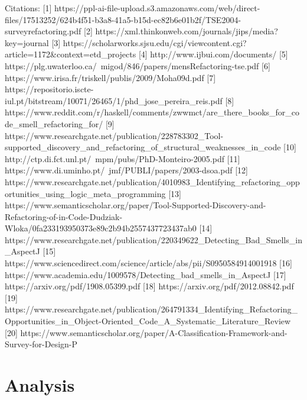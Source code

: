 Citations:
[1] https://ppl-ai-file-upload.s3.amazonaws.com/web/direct-files/17513252/624b4f51-b3a8-41a5-b15d-ec82b6e01b2f/TSE2004-surveyrefactoring.pdf
[2] https://xml.thinkonweb.com/journals/jips/media?key=journal%
[3] https://scholarworks.sjsu.edu/cgi/viewcontent.cgi?article=1172&context=etd_projects
[4] http://www.ijbui.com/documents/%
[5] https://plg.uwaterloo.ca/~migod/846/papers/mensRefactoring-tse.pdf
[6] https://www.irisa.fr/triskell/publis/2009/Moha09d.pdf
[7] https://repositorio.iscte-iul.pt/bitstream/10071/26465/1/phd_jose_pereira_reis.pdf
[8] https://www.reddit.com/r/haskell/comments/zwwmct/are_there_books_for_code_smell_refactoring_for/
[9] https://www.researchgate.net/publication/228783302_Tool-supported_discovery_and_refactoring_of_structural_weaknesses_in_code
[10] http://ctp.di.fct.unl.pt/~mpm/pubs/PhD-Monteiro-2005.pdf
[11] https://www.di.uminho.pt/~jmf/PUBLI/papers/2003-dsoa.pdf
[12] https://www.researchgate.net/publication/4010983_Identifying_refactoring_opportunities_using_logic_meta_programming
[13] https://www.semanticscholar.org/paper/Tool-Supported-Discovery-and-Refactoring-of-in-Code-Dudziak-Wloka/0fa233193950373e89c2b94b2557437723437ab0
[14] https://www.researchgate.net/publication/220349622_Detecting_Bad_Smells_in_AspectJ
[15] https://www.sciencedirect.com/science/article/abs/pii/S0950584914001918
[16] https://www.academia.edu/1009578/Detecting_bad_smells_in_AspectJ
[17] https://arxiv.org/pdf/1908.05399.pdf
[18] https://arxiv.org/pdf/2012.08842.pdf
[19] https://www.researchgate.net/publication/264791334_Identifying_Refactoring_Opportunities_in_Object-Oriented_Code_A_Systematic_Literature_Review
[20] https://www.semanticscholar.org/paper/A-Classification-Framework-and-Survey-for-Design-P%

\section{Analysis}

